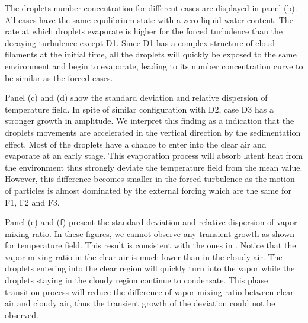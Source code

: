 \documentclass[draft,jgrga]{AGUTeX}
\begin{document}
\begin{article}
The droplets number concentration for different cases are displayed in panel (b). All cases have the same equilibrium state with a zero liquid water content. The rate at which droplets evaporate is higher for the forced turbulence than the decaying turbulence except D1. Since D1 has a complex structure of cloud filaments at the initial time, all the droplets will quickly be exposed to the same environment and begin to evaporate, leading to its number concentration curve to be similar as the forced cases.

Panel (c) and (d) show the standard deviation and relative dispersion of temperature field. In spite of similar configuration with D2, case D3 has a stronger growth in amplitude. We interpret this finding as a indication that the droplets movements are accelerated in the vertical direction by the sedimentation effect. Most of the droplets have a chance to enter into the clear air and evaporate at an early stage. This evaporation process will absorb latent heat from the environment thus strongly deviate the temperature field from the mean value. However, this difference becomes smaller in the forced turbulence as the motion of particles is almost dominated by the external forcing which are the same for F1, F2 and F3.

Panel (e) and (f) present the standard deviation and relative dispersion of vapor mixing ratio. In these figures, we cannot observe any transient growth as shown for temperature field. This result is consistent with the ones in \cite{Kumar14}. Notice that the vapor mixing ratio in the clear air is much lower than in the cloudy air. The droplets entering into the clear region will quickly turn into the vapor while the droplets staying in the cloudy region continue to condensate. This phase transition process will reduce the difference of vapor mixing ratio between clear air and cloudy air, thus the transient growth of the deviation could not be observed.


\end{article}
\end{document}
